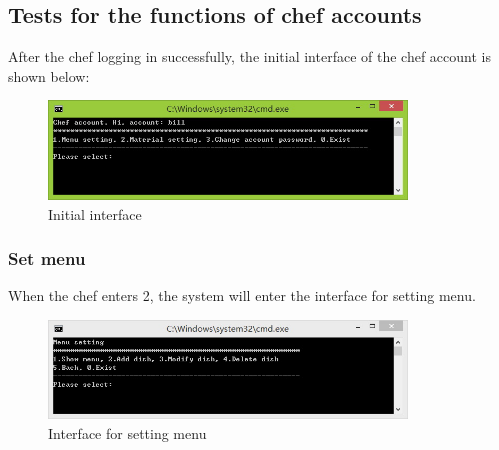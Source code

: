 \documentclass{article}
\begin{document}
\subsection{Tests for the functions of chef accounts}
After the chef logging in successfully, the initial interface of the chef account is shown below:
\begin{figure}[H]
    \centering
    \includegraphics[width=0.85\textwidth]{Q/00.jpg}
    \caption{Initial interface}
\end{figure}

\subsubsection{Set menu}
When the chef enters 2, the system will enter the interface for setting menu.
\begin{figure}[H]
    \centering
    \includegraphics[width=0.85\textwidth]{Q/1/Q_0b1.jpg}
    \caption{Interface for setting menu}
\end{figure}
        
\end{document}
